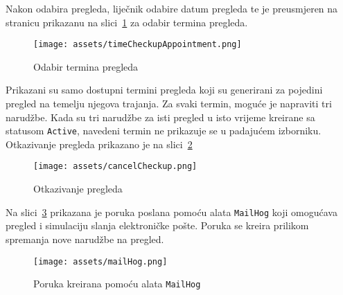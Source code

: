 Nakon odabira pregleda, liječnik odabire datum pregleda te je preusmjeren na stranicu prikazanu na slici~\ref{fig:timeCheckupAppointment} za odabir termina pregleda.

\begin{figure}[H]
	\texttt{[image: assets/timeCheckupAppointment.png]}
	\centering
	\caption{Odabir termina pregleda}
	\label{fig:timeCheckupAppointment}
\end{figure}

Prikazani su samo dostupni termini pregleda koji su generirani za pojedini pregled na temelju njegova trajanja. Za svaki termin, moguće je napraviti tri narudžbe. Kada su tri narudžbe za isti pregled u isto vrijeme kreirane sa statusom \texttt{Active}, navedeni termin ne prikazuje se u padajućem izborniku. Otkazivanje pregleda prikazano je na slici~\ref{fig:cancelCheckup}

\begin{figure}[H]
	\texttt{[image: assets/cancelCheckup.png]}
	\centering
	\caption{Otkazivanje pregleda}
	\label{fig:cancelCheckup}
\end{figure}

Na slici~\ref{fig:mailHog} prikazana je poruka poslana pomoću alata \texttt{MailHog} koji omogućava pregled i simulaciju slanja elektroničke pošte. Poruka se kreira prilikom spremanja nove narudžbe na pregled.

\begin{figure}[H]
	\texttt{[image: assets/mailHog.png]}
	\centering
	\caption{Poruka kreirana pomoću alata \texttt{MailHog}}
	\label{fig:mailHog}
\end{figure}